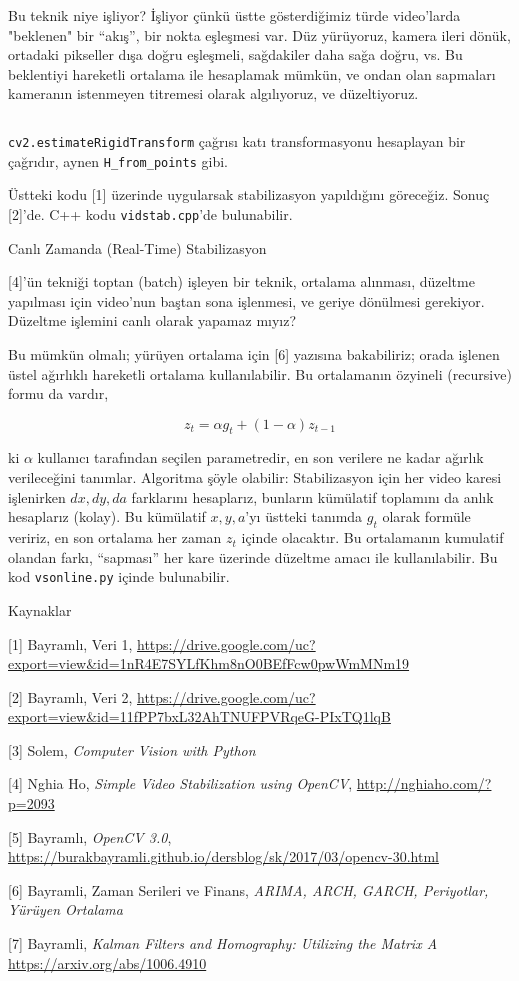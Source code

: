 \documentclass[12pt,fleqn]{article}\usepackage{../../common}
\begin{document}
Bu teknik niye işliyor? İşliyor çünkü üstte gösterdiğimiz türde video'larda
"beklenen" bir ``akış'', bir nokta eşleşmesi var. Düz yürüyoruz, kamera
ileri dönük, ortadaki pikseller dışa doğru eşleşmeli, sağdakiler daha sağa
doğru, vs.  Bu beklentiyi hareketli ortalama ile hesaplamak mümkün, ve
ondan olan sapmaları kameranın istenmeyen titremesi olarak algılıyoruz, ve
düzeltiyoruz.

\inputminted[fontsize=\footnotesize]{python}{vidstab.py}

\verb!cv2.estimateRigidTransform! çağrısı katı transformasyonu hesaplayan
bir çağrıdır, aynen \verb!H_from_points! gibi. 

Üstteki kodu [1] üzerinde uygularsak stabilizasyon yapıldığını
göreceğiz. Sonuç [2]'de. C++ kodu \verb!vidstab.cpp!'de bulunabilir.

Canlı Zamanda (Real-Time) Stabilizasyon

[4]'ün tekniği toptan (batch) işleyen bir teknik, ortalama alınması,
düzeltme yapılması için video'nun baştan sona işlenmesi, ve geriye
dönülmesi gerekiyor. Düzeltme işlemini canlı olarak yapamaz mıyız?

Bu mümkün olmalı; yürüyen ortalama için [6] yazısına bakabiliriz;
orada işlenen üstel ağırlıklı hareketli ortalama kullanılabilir. Bu
ortalamanın özyineli (recursive) formu da vardır,

$$ z_t = \alpha g_t + (1-\alpha) z_{t-1}$$

ki $\alpha$ kullanıcı tarafından seçilen parametredir, en son verilere ne
kadar ağırlık verileceğini tanımlar. Algoritma şöyle olabilir:
Stabilizasyon için her video karesi işlenirken $dx,dy,da$ farklarını
hesaplarız, bunların kümülatif toplamını da anlık hesaplarız (kolay). Bu
kümülatif $x,y,a$'yı üstteki tanımda $g_t$ olarak formüle veririz, en son
ortalama her zaman $z_t$ içinde olacaktır. Bu ortalamanın kumulatif olandan
farkı, ``sapması'' her kare üzerinde düzeltme amacı ile kullanılabilir. Bu
kod \verb!vsonline.py! içinde bulunabilir.

Kaynaklar

[1] Bayramlı, Veri 1, \url{https://drive.google.com/uc?export=view&id=1nR4E7SYLfKhm8nO0BEfFcw0pwWmMNm19}

[2] Bayramlı, Veri 2, \url{https://drive.google.com/uc?export=view&id=11fPP7bxL32AhTNUFPVRqeG-PIxTQ1lqB}

[3] Solem, {\em Computer Vision with Python}

[4] Nghia Ho, {\em Simple Video Stabilization using OpenCV},
    \url{http://nghiaho.com/?p=2093}

[5] Bayramlı, {\em OpenCV 3.0}, 
    \url{https://burakbayramli.github.io/dersblog/sk/2017/03/opencv-30.html}

[6] Bayramli, Zaman Serileri ve Finans, {\em ARIMA, ARCH, GARCH, Periyotlar, Yürüyen Ortalama}

[7] Bayramli, {\em Kalman Filters and Homography: Utilizing the Matrix A}
    \url{https://arxiv.org/abs/1006.4910}
\end{document}
